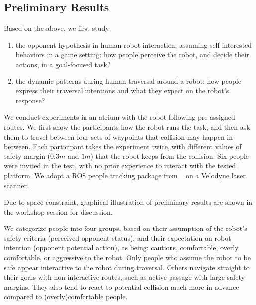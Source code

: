 \documentclass[conference]{IEEEtran}
\begin{document}
\subsection{Preliminary Results}
Based on the above, we first study:
\begin{enumerate}
\item the opponent hypothesis in human-robot interaction, assuming 
  self-interested behaviors in a game setting: how people perceive the robot, 
  and decide their actions, in a goal-focused task?
\item the dynamic patterns during human traversal around a robot: how people 
  express their traversal intentions and what they expect on the robot's 
  response?
\end{enumerate}

We conduct experiments in an atrium with the robot following pre-assigned 
routes. We first show the participants how the robot runs the task, and then 
ask them to travel between four sets of waypoints that collision may happen in 
between. Each participant takes the experiment twice, with different values of 
safety margin ($0.3m$ and $1m$) that the robot keeps from the collision. Six 
people were invited in the test, with no prior experience to interact with the 
tested platform. We adopt a ROS people tracking package from ~\cite{leigh2015person}
on a Velodyne laser scanner. 

Due to space constraint, graphical illustration of preliminary results are 
shown in the workshop session for discussion. 

We categorize people into four groups, based on their assumption of the 
robot's safety criteria (perceived opponent status), and their expectation on 
robot intention (opponent potential action), as being: cautious, comfortable, 
overly comfortable, or aggressive to the robot. Only people who assume the 
robot to be safe appear interactive to the robot during traversal. Others 
navigate straight to their goals with non-interactive routes, such as active 
passage with large safety margins. They also tend to react to potential 
collision much more in advance compared to (overly)comfortable people. 
\end{document}
